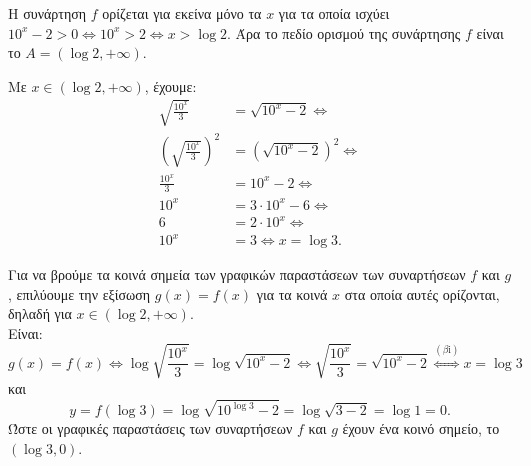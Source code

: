 \begin{alist}
\item Η συνάρτηση $f$ ορίζεται για εκείνα μόνο τα $x$ για τα οποία ισχύει $10^x - 2 > 0 \Leftrightarrow 10^x > 2 \Leftrightarrow x > \log 2$. Άρα το πεδίο ορισμού της συνάρτησης $f$ είναι το $A = (\log 2, +\infty)$.
\item 
\begin{rlist}
\item Με $x \in (\log 2, +\infty)$, έχουμε:
\begin{align*}
\sqrt{\frac{10^x}{3}} &= \sqrt{10^x - 2} \Leftrightarrow \\
\left(\sqrt{\frac{10^x}{3}}\right)^2 &= \left(\sqrt{10^x - 2}\right)^2 \Leftrightarrow \\
\frac{10^x}{3} &= 10^x - 2 \Leftrightarrow \\
10^x &= 3\cdot 10^x - 6 \Leftrightarrow \\
6 &= 2\cdot 10^x \Leftrightarrow \\
10^x &= 3 \Leftrightarrow x = \log 3.
\end{align*}
\item Για να βρούμε τα κοινά σημεία των γραφικών παραστάσεων των συναρτήσεων $f$ και $g$, επιλύουμε την εξίσωση $g(x) = f(x)$ για τα κοινά $x$ στα οποία αυτές ορίζονται, δηλαδή για $x \in (\log 2, +\infty)$. \\
Είναι:
\[g(x) = f(x) \Leftrightarrow \log\sqrt{\frac{10^x}{3}} = \log\sqrt{10^x - 2} \Leftrightarrow \sqrt{\frac{10^x}{3}} = \sqrt{10^x - 2} \overset{(\beta\text{i})}{\iff} x = \log 3\]
και
\[y = f(\log 3) = \log\sqrt{10^{\log 3} - 2} = \log\sqrt{3 - 2} = \log 1 = 0.\]
Ώστε οι γραφικές παραστάσεις των συναρτήσεων $f$ και $g$ έχουν ένα κοινό σημείο, το $(\log 3, 0)$.
\end{rlist}
\end{alist}

